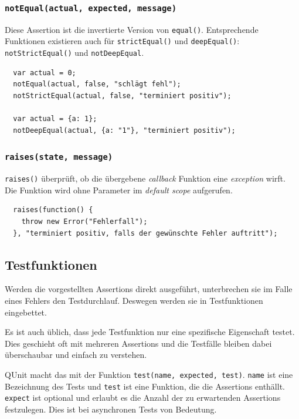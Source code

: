 \documentclass[11pt, a4paper]{article}
\begin{document}
\subsubsection*{\texttt{notEqual(actual, expected, message)}}

Diese Assertion ist die invertierte Version von \texttt{equal()}.
Entsprechende Funktionen existieren auch für \texttt{strictEqual()} und
\texttt{deepEqual()}: \texttt{notStrictEqual()} und \texttt{notDeepEqual}.

\begin{verbatim}
  var actual = 0;
  notEqual(actual, false, "schlägt fehl");
  notStrictEqual(actual, false, "terminiert positiv");

  var actual = {a: 1};
  notDeepEqual(actual, {a: "1"}, "terminiert positiv");
\end{verbatim}

\subsubsection*{\texttt{raises(state, message)}}

\texttt{raises()} überprüft, ob die übergebene \emph{callback} Funktion eine
\emph{exception} wirft. Die Funktion wird ohne Parameter im \emph{default scope}
aufgerufen.

\begin{verbatim}
  raises(function() {
    throw new Error("Fehlerfall");
  }, "terminiert positiv, falls der gewünschte Fehler auftritt");
\end{verbatim}

\subsection{Testfunktionen}

Werden die vorgestellten Assertions direkt ausgeführt, unterbrechen sie
im Falle eines Fehlers den Testdurchlauf. Deswegen werden sie in Testfunktionen
eingebettet.

Es ist auch üblich, dass jede Testfunktion nur eine spezifische Eigenschaft
testet. Dies geschieht oft mit mehreren Assertions und die Testfälle
bleiben dabei überschaubar und einfach zu verstehen.

QUnit macht das mit der Funktion \texttt{test(name, expected, test)}.
\texttt{name} ist eine Bezeichnung des Tests und \texttt{test} ist eine
Funktion, die die Assertions enthällt. \texttt{expect} ist optional und
erlaubt es die Anzahl der zu erwartenden Assertions festzulegen. Dies ist
bei asynchronen Tests von Bedeutung.
\end{document}
